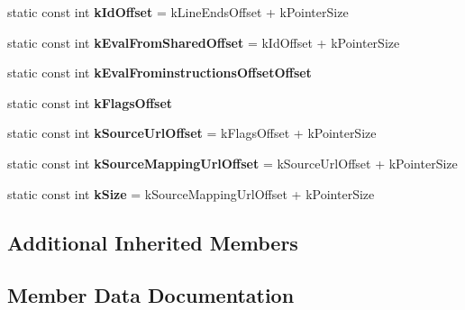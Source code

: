 \begin{DoxyCompactItemize}
\item 
\hypertarget{classv8_1_1internal_1_1_script_aee4b2225f5e2ec14f122c6d06d0f1c51}{}static const int {\bfseries k\+Id\+Offset} = k\+Line\+Ends\+Offset + k\+Pointer\+Size\label{classv8_1_1internal_1_1_script_aee4b2225f5e2ec14f122c6d06d0f1c51}

\item 
\hypertarget{classv8_1_1internal_1_1_script_ad65ac113056769cff3093fede56c5c34}{}static const int {\bfseries k\+Eval\+From\+Shared\+Offset} = k\+Id\+Offset + k\+Pointer\+Size\label{classv8_1_1internal_1_1_script_ad65ac113056769cff3093fede56c5c34}

\item 
static const int {\bfseries k\+Eval\+Frominstructions\+Offset\+Offset}
\item 
static const int {\bfseries k\+Flags\+Offset}
\item 
\hypertarget{classv8_1_1internal_1_1_script_a7568c12789b46731e2189037d7b41841}{}static const int {\bfseries k\+Source\+Url\+Offset} = k\+Flags\+Offset + k\+Pointer\+Size\label{classv8_1_1internal_1_1_script_a7568c12789b46731e2189037d7b41841}

\item 
\hypertarget{classv8_1_1internal_1_1_script_a23d5b6efceed60bc940db2870f4d8ebd}{}static const int {\bfseries k\+Source\+Mapping\+Url\+Offset} = k\+Source\+Url\+Offset + k\+Pointer\+Size\label{classv8_1_1internal_1_1_script_a23d5b6efceed60bc940db2870f4d8ebd}

\item 
\hypertarget{classv8_1_1internal_1_1_script_a80d31769a7f5c7901ff3a9534b4fcae3}{}static const int {\bfseries k\+Size} = k\+Source\+Mapping\+Url\+Offset + k\+Pointer\+Size\label{classv8_1_1internal_1_1_script_a80d31769a7f5c7901ff3a9534b4fcae3}

\end{DoxyCompactItemize}
\subsection*{Additional Inherited Members}


\subsection{Member Data Documentation}
\hypertarget{classv8_1_1internal_1_1_script_a5c7eecae36ba89633e7a9854a7f79629}{}
